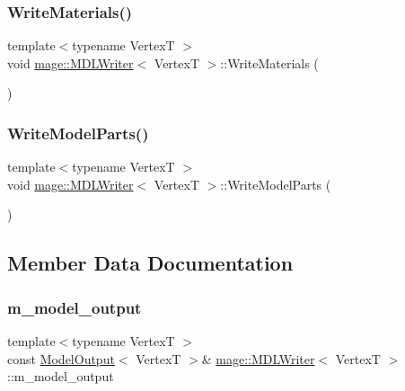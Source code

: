 \subsubsection{\texorpdfstring{Write\+Materials()}{WriteMaterials()}}
{\footnotesize\ttfamily template$<$typename VertexT $>$ \\
void \hyperlink{classmage_1_1_m_d_l_writer}{mage\+::\+M\+D\+L\+Writer}$<$ VertexT $>$\+::Write\+Materials (\begin{DoxyParamCaption}{ }\end{DoxyParamCaption})\hspace{0.3cm}{\ttfamily [private]}}

\hypertarget{classmage_1_1_m_d_l_writer_a3db84a4600cb777b37c666166a631689}{}\label{classmage_1_1_m_d_l_writer_a3db84a4600cb777b37c666166a631689} 
\subsubsection{\texorpdfstring{Write\+Model\+Parts()}{WriteModelParts()}}
{\footnotesize\ttfamily template$<$typename VertexT $>$ \\
void \hyperlink{classmage_1_1_m_d_l_writer}{mage\+::\+M\+D\+L\+Writer}$<$ VertexT $>$\+::Write\+Model\+Parts (\begin{DoxyParamCaption}{ }\end{DoxyParamCaption})\hspace{0.3cm}{\ttfamily [private]}}



\subsection{Member Data Documentation}
\hypertarget{classmage_1_1_m_d_l_writer_a607fc83a3dbab79f55c3eaca203c027b}{}\label{classmage_1_1_m_d_l_writer_a607fc83a3dbab79f55c3eaca203c027b} 
\subsubsection{\texorpdfstring{m\+\_\+model\+\_\+output}{m\_model\_output}}
{\footnotesize\ttfamily template$<$typename VertexT $>$ \\
const \hyperlink{structmage_1_1_model_output}{Model\+Output}$<$ VertexT $>$\& \hyperlink{classmage_1_1_m_d_l_writer}{mage\+::\+M\+D\+L\+Writer}$<$ VertexT $>$\+::m\+\_\+model\+\_\+output\hspace{0.3cm}{\ttfamily [private]}}

